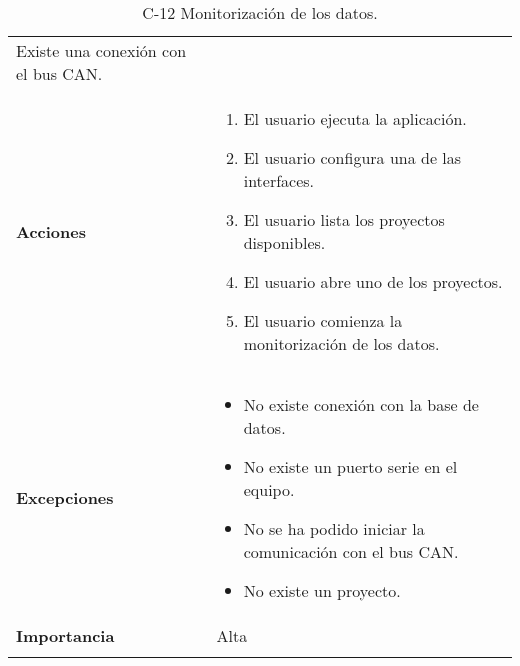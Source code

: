 \begin{longtable}[H]{@{}ll@{}}
\begin{minipage}[t]{0.71\columnwidth}
Existe una conexión con el bus CAN.
\strut
\end{minipage}\tabularnewline
\begin{minipage}[t]{0.23\columnwidth}\raggedright\strut
\textbf{Acciones}\strut
\end{minipage} & \begin{minipage}[t]{0.71\columnwidth}\raggedright\strut
\begin{enumerate}
\def\labelenumi{\arabic{enumi}.}
\item
El usuario ejecuta la aplicación.
\item
El usuario configura una de las interfaces.
\item
El usuario lista los proyectos disponibles.
\item
El usuario abre uno de los proyectos.
\item
El usuario comienza la monitorización de los datos.
\end{enumerate}\strut
\end{minipage}\tabularnewline
\begin{minipage}[t]{0.23\columnwidth}\raggedright\strut
\textbf{Excepciones}\strut
\end{minipage} & \begin{minipage}[t]{0.71\columnwidth}\raggedright\strut
\begin{itemize}
\item
No existe conexión con la base de datos.
\item
No existe un puerto serie en el equipo.
\item
No se ha podido iniciar la comunicación con el bus CAN.
\item
No existe un proyecto.
\end{itemize}\strut
\end{minipage}\tabularnewline
\begin{minipage}[t]{0.23\columnwidth}\raggedright\strut
\textbf{Importancia}\strut
\end{minipage} & \begin{minipage}[t]{0.71\columnwidth}\raggedright\strut
Alta\strut
\end{minipage}\tabularnewline
\bottomrule
\caption{C-12 Monitorización de los datos.}
\end{longtable}